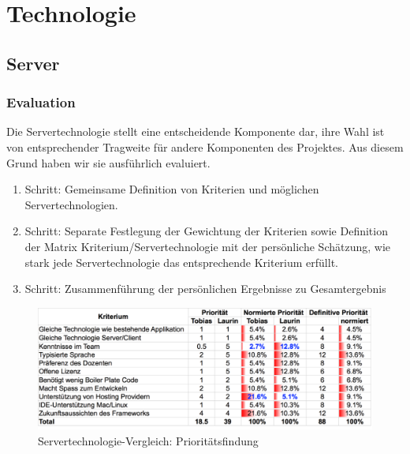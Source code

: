 \section{Technologie}\label{architektur.technologie}
	\subsection{Server}

		\subsubsection{Evaluation}\label{serverEvaluation}
			Die Servertechnologie stellt eine entscheidende Komponente dar, 
			ihre Wahl ist von entsprechender Tragweite für andere Komponenten des Projektes.
			Aus diesem Grund haben wir sie ausführlich evaluiert.
			
			\begin{enumerate}
				\item Schritt: Gemeinsame Definition von Kriterien und möglichen Servertechnologien.
				\item Schritt: Separate Festlegung der Gewichtung der Kriterien sowie Definition der Matrix Kriterium/Servertechnologie mit der persönliche Schätzung, wie stark jede Servertechnologie das entsprechende Kriterium erfüllt.
				\item Schritt: Zusammenführung der persönlichen Ergebnisse zu Gesamtergebnis
			\end{enumerate}
		
			\begin{figure}[H]
				\begin{minipage}[b]{\linewidth}
					\includegraphics[width=\textwidth]{media/spreadsheets/ServertechnologieVergleichPrioritaetsfinding.pdf}
					\centering
					\caption{Servertechnologie-Vergleich: Prioritätsfindung}
					\label{fig:ServertechnologieVergleichPrioritaetsfinding}
				\end{minipage}
			\end{figure}
			
